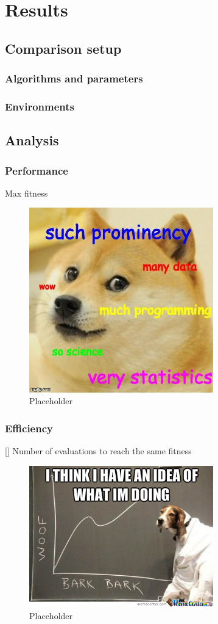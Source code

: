 \chapter{Results}
\label{chap:results}

\section{Comparison setup}
\subsection{Algorithms and parameters}

\subsection{Environments}

\section{Analysis}

\subsection{Performance}
Max fitness
\begin{figure}[H]
\centering
\includegraphics[width=8cm]{images/data_meme.jpg}
\caption{Placeholder}
\end{figure}
      
      
\subsection{Efficiency}[]
Number of evaluations to reach the same fitness
\begin{figure}[H]
\centering
\includegraphics[width=8cm]{images/data_meme2.jpg}
\caption{Placeholder}
\end{figure}

